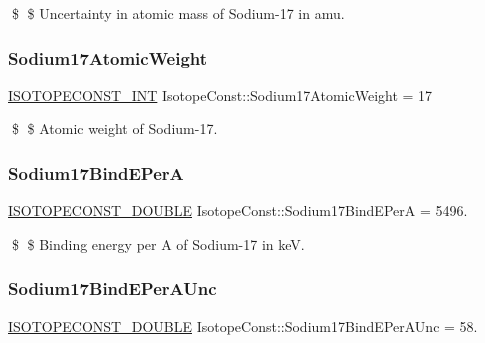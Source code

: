 \$ \$ Uncertainty in atomic mass of Sodium-\/17 in amu. \mbox{\label{group___isotope_const-_sodium-_na17_ga9ebfab20c9270178ef965a1119812eb2}} 
\subsubsection{\texorpdfstring{Sodium17\+Atomic\+Weight}{Sodium17AtomicWeight}}
{\footnotesize\ttfamily \mbox{\hyperlink{group___isotope_const-_macros_ga5f18360b3e99483a35c32d789e62621c}{I\+S\+O\+T\+O\+P\+E\+C\+O\+N\+S\+T\+\_\+\+I\+NT}} Isotope\+Const\+::\+Sodium17\+Atomic\+Weight = 17}

\$ \$ Atomic weight of Sodium-\/17. \mbox{\label{group___isotope_const-_sodium-_na17_ga11d7eda6db4c5bb835aa69d09655ec28}} 
\subsubsection{\texorpdfstring{Sodium17\+Bind\+E\+PerA}{Sodium17BindEPerA}}
{\footnotesize\ttfamily \mbox{\hyperlink{group___isotope_const-_macros_ga8f45a7272ce02c0b4c65c44636ed719a}{I\+S\+O\+T\+O\+P\+E\+C\+O\+N\+S\+T\+\_\+\+D\+O\+U\+B\+LE}} Isotope\+Const\+::\+Sodium17\+Bind\+E\+PerA = 5496.}

\$ \$ Binding energy per A of Sodium-\/17 in keV. \mbox{\label{group___isotope_const-_sodium-_na17_ga63a3b67967d78cadba347717a273862d}} 
\subsubsection{\texorpdfstring{Sodium17\+Bind\+E\+Per\+A\+Unc}{Sodium17BindEPerAUnc}}
{\footnotesize\ttfamily \mbox{\hyperlink{group___isotope_const-_macros_ga8f45a7272ce02c0b4c65c44636ed719a}{I\+S\+O\+T\+O\+P\+E\+C\+O\+N\+S\+T\+\_\+\+D\+O\+U\+B\+LE}} Isotope\+Const\+::\+Sodium17\+Bind\+E\+Per\+A\+Unc = 58.}

